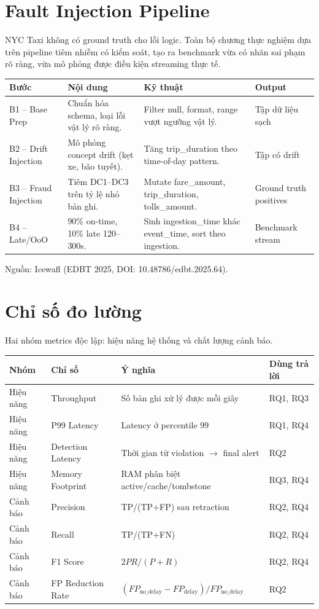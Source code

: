 \section{Fault Injection Pipeline}

NYC Taxi không có ground truth cho lỗi logic. Toàn bộ chương thực nghiệm dựa trên pipeline tiêm nhiễm có kiểm soát, tạo ra benchmark vừa có nhãn sai phạm rõ ràng, vừa mô phỏng được điều kiện streaming thực tế.

{\small
\begin{longtable}{|L{0.12\textwidth}|L{0.28\textwidth}|L{0.34\textwidth}|L{0.16\textwidth}|}
\hline
\textbf{Bước} & \textbf{Nội dung} & \textbf{Kỹ thuật} & \textbf{Output} \\
\hline
B1 -- Base Prep & Chuẩn hóa schema, loại lỗi vật lý rõ ràng. & Filter null, format, range vượt ngưỡng vật lý. & Tập dữ liệu sạch \\
\hline
B2 -- Drift Injection & Mô phỏng concept drift (kẹt xe, bão tuyết). & Tăng trip\_duration theo time-of-day pattern. & Tập có drift \\
\hline
B3 -- Fraud Injection & Tiêm DC1--DC3 trên tỷ lệ nhỏ bản ghi. & Mutate fare\_amount, trip\_duration, tolls\_amount. & Ground truth positives \\
\hline
B4 -- Late/OoO & 90\% on-time, 10\% late 120--300s. & Sinh ingestion\_time khác event\_time, sort theo ingestion. & Benchmark stream \\
\hline
\end{longtable}
}

Nguồn: Icewafl \cite{edbt2025icewafl} (EDBT 2025, DOI: 10.48786/edbt.2025.64).

\section{Chỉ số đo lường}

Hai nhóm metrics độc lập: hiệu năng hệ thống và chất lượng cảnh báo.

{\small
\begin{longtable}{|L{0.15\textwidth}|L{0.22\textwidth}|L{0.22\textwidth}|L{0.31\textwidth}|}
\hline
\textbf{Nhóm} & \textbf{Chỉ số} & \textbf{Ý nghĩa} & \textbf{Dùng trả lời} \\
\hline
Hiệu năng & Throughput & Số bản ghi xử lý được mỗi giây & RQ1, RQ3 \\
\hline
Hiệu năng & P99 Latency & Latency ở percentile 99 & RQ1, RQ4 \\
\hline
Hiệu năng & Detection Latency & Thời gian từ violation $\rightarrow$ final alert & RQ2 \\
\hline
Hiệu năng & Memory Footprint & RAM phân biệt active/cache/tombstone & RQ3, RQ4 \\
\hline
Cảnh báo & Precision & TP/(TP+FP) sau retraction & RQ2, RQ4 \\
\hline
Cảnh báo & Recall & TP/(TP+FN) & RQ2, RQ4 \\
\hline
Cảnh báo & F1 Score & $2PR/(P+R)$ & RQ2, RQ4 \\
\hline
Cảnh báo & FP Reduction Rate & $(FP_{\text{no\_delay}} - FP_{\text{delay}})/FP_{\text{no\_delay}}$ & RQ2 \\
\hline
\end{longtable}
}

